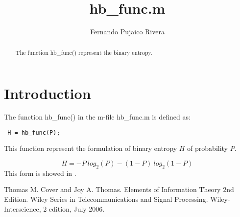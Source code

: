 \documentclass[a4paper,10pt]{article}
\title{hb\_func.m}
\author{Fernando Pujaico Rivera}
\begin{document}
\maketitle
\begin{abstract}
The function hb\_func() represent the binary entropy.
\end{abstract}

\section{Introduction}
The function hb\_func() in the m-file hb\_func.m is defined as:
\lstset{language=octave}%
\begin{lstlisting}
 H = hb_func(P);
\end{lstlisting}
This function represent the formulation of binary entropy $H$ of probability $P$.

\begin{equation}\label{eq:hb}
H = -P~log_2(P) -(1-P)~log_2(1-P)
\end{equation}
This form is showed in \cite{thomas}.

 \begin{thebibliography}{99}
 
Thomas M. Cover and Joy A. Thomas. Elements of Information Theory 2nd Edition. 
Wiley Series in Telecommunications and Signal Processing. 
Wiley-Interscience, 2 edition, July 2006.



 \end{thebibliography} 
\end{document}
